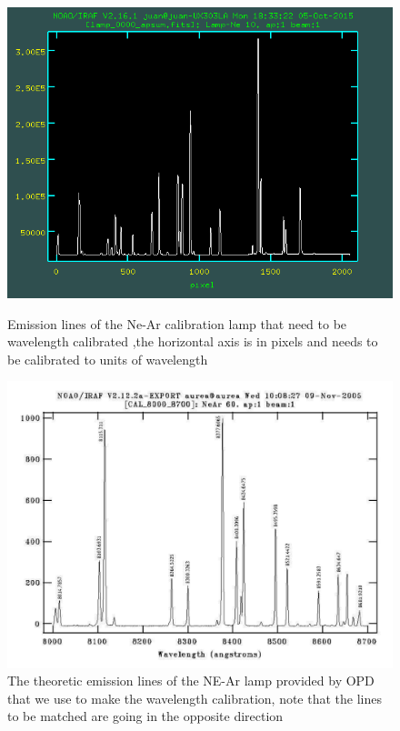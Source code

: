 \begin{figure}[H]
  \centering
  \begin{minipage}[b]{0.45\textwidth}
    \includegraphics[width=\textwidth]{images/lamp_day1_2.png}
    \caption{Emission lines of the Ne-Ar calibration lamp that need to be wavelength calibrated ,the horizontal axis is in pixels and needs to be calibrated to units of wavelength}
  \end{minipage}
  \hfill
  \begin{minipage}[b]{0.45\textwidth}
    \includegraphics[width=\textwidth]{images/lamp1.png}
    \caption{The theoretic emission lines of the NE-Ar lamp provided by OPD that we use to make the wavelength calibration, note that the lines to be matched are going in the opposite direction}
  \end{minipage}
\end{figure}

